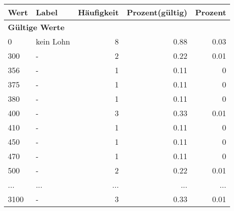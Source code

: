      \begin{longtable}{lXrrr}
     \toprule
     \textbf{Wert} & \textbf{Label} & \textbf{Häufigkeit} & \textbf{Prozent(gültig)} & \textbf{Prozent} \\
     \endhead
     \midrule
     \multicolumn{5}{l}{\textbf{Gültige Werte}}\\
        0 & \multicolumn{1}{X}{kein Lohn} & %
          \num{8} &
          \num[round-mode=places,round-precision=2]{0.88} &
          \num[round-mode=places,round-precision=2]{0.03} \\
        300 & \multicolumn{1}{X}{-} & %
          \num{2} &
          \num[round-mode=places,round-precision=2]{0.22} &
          \num[round-mode=places,round-precision=2]{0.01} \\
        356 & \multicolumn{1}{X}{-} & %
          \num{1} &
          \num[round-mode=places,round-precision=2]{0.11} &
          \num[round-mode=places,round-precision=2]{0} \\
        375 & \multicolumn{1}{X}{-} & %
          \num{1} &
          \num[round-mode=places,round-precision=2]{0.11} &
          \num[round-mode=places,round-precision=2]{0} \\
        380 & \multicolumn{1}{X}{-} & %
          \num{1} &
          \num[round-mode=places,round-precision=2]{0.11} &
          \num[round-mode=places,round-precision=2]{0} \\
        400 & \multicolumn{1}{X}{-} & %
          \num{3} &
          \num[round-mode=places,round-precision=2]{0.33} &
          \num[round-mode=places,round-precision=2]{0.01} \\
        410 & \multicolumn{1}{X}{-} & %
          \num{1} &
          \num[round-mode=places,round-precision=2]{0.11} &
          \num[round-mode=places,round-precision=2]{0} \\
        450 & \multicolumn{1}{X}{-} & %
          \num{1} &
          \num[round-mode=places,round-precision=2]{0.11} &
          \num[round-mode=places,round-precision=2]{0} \\
        470 & \multicolumn{1}{X}{-} & %
          \num{1} &
          \num[round-mode=places,round-precision=2]{0.11} &
          \num[round-mode=places,round-precision=2]{0} \\
        500 & \multicolumn{1}{X}{-} & %
          \num{2} &
          \num[round-mode=places,round-precision=2]{0.22} &
          \num[round-mode=places,round-precision=2]{0.01} \\
       ... & ... & ... & ... & ... \\
        3100 & \multicolumn{1}{X}{-} & %
          \num{3} &
          \num[round-mode=places,round-precision=2]{0.33} &
          \num[round-mode=places,round-precision=2]{0.01} \\


\end{longtable}
